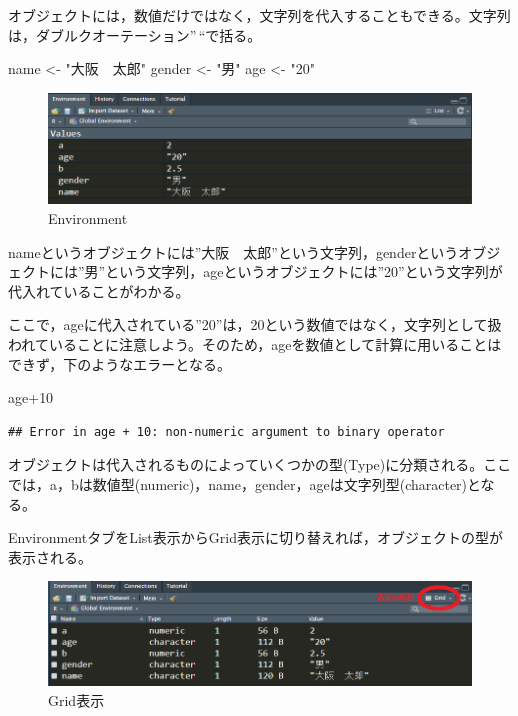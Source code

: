 \documentclass[
]{book}
\newenvironment{Shaded}{\begin{snugshade}}{\end{snugshade}}
\newcommand{\DecValTok}[1]{\textcolor[rgb]{0.00,0.00,0.81}{#1}}
\newcommand{\NormalTok}[1]{#1}
\newcommand{\OtherTok}[1]{\textcolor[rgb]{0.56,0.35,0.01}{#1}}
\newcommand{\SpecialCharTok}[1]{\textcolor[rgb]{0.00,0.00,0.00}{#1}}
\newcommand{\StringTok}[1]{\textcolor[rgb]{0.31,0.60,0.02}{#1}}
\begin{document}
オブジェクトには，数値だけではなく，文字列を代入することもできる。文字列は，ダブルクオーテーション''\,``で括る。

\begin{Shaded}
\begin{Highlighting}[]
\NormalTok{name }\OtherTok{\textless{}{-}} \StringTok{"大阪　太郎"}
\NormalTok{gender }\OtherTok{\textless{}{-}} \StringTok{"男"}
\NormalTok{age }\OtherTok{\textless{}{-}} \StringTok{"20"}
\end{Highlighting}
\end{Shaded}

\begin{figure}
\centering
\includegraphics{moji.png}
\caption{Environment}
\end{figure}

nameというオブジェクトには''大阪　太郎''という文字列，genderというオブジェクトには''男''という文字列，ageというオブジェクトには''20''という文字列が代入れていることがわかる。

ここで，ageに代入されている''20''は，20という数値ではなく，文字列として扱われていることに注意しよう。そのため，ageを数値として計算に用いることはできず，下のようなエラーとなる。

\begin{Shaded}
\begin{Highlighting}[]
\NormalTok{age}\SpecialCharTok{+}\DecValTok{10}
\end{Highlighting}
\end{Shaded}

\begin{verbatim}
## Error in age + 10: non-numeric argument to binary operator
\end{verbatim}

オブジェクトは代入されるものによっていくつかの型(Type)に分類される。ここでは，a，bは数値型(numeric)，name，gender，ageは文字列型(character)となる。

EnvironmentタブをList表示からGrid表示に切り替えれば，オブジェクトの型が表示される。

\begin{figure}
\centering
\includegraphics{grid.png}
\caption{Grid表示}
\end{figure}
\end{document}
